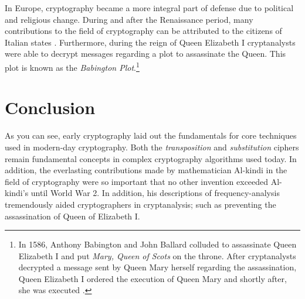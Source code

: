 In Europe, cryptography became a more integral part of defense due to political and religious change. During and after the Renaissance period,
many contributions to the field of cryptography can be attributed to the citizens of Italian states \cite{wiki:history_of_cryptography}.
Furthermore, during the reign of Queen Elizabeth I cryptanalysts were able to decrypt messages regarding a plot to assassinate the Queen.
This plot is known as the \textit{Babington Plot}.\footnote{In 1586, Anthony Babington and John Ballard colluded to assassinate Queen Elizabeth I 
and put \textit{Mary, Queen of Scots} on the throne. After cryptanalysts decrypted a message sent by Queen Mary herself regarding the assassination, Queen
Elizabeth I ordered the execution of Queen Mary and shortly after, she was executed \cite{wiki:babington_plot}. }

\section{Conclusion}

As you can see, early cryptography laid out the fundamentals for core techniques used in modern-day cryptography.
Both the \textit{transposition} and \textit{substitution} ciphers remain fundamental concepts in complex cryptography
algorithms used today. In addition, the everlasting contributions made by mathematician Al-kindi in the field
of cryptography were so important that no other invention exceeded Al-kindi's until World War 2. In addition, his descriptions of 
frequency-analysis tremendously aided cryptographers in cryptanalysis; such as preventing the assassination of Queen of Elizabeth I.
